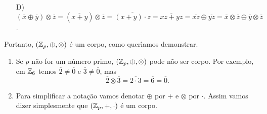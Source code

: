 \begin{prova}
\begin{enumerate}
\begin{align*}
			&\overline{xy} \oplus \overline{pz} = \overline{1}\\
			&\overline{x} \otimes \overline{y} + \overline{p} \otimes \overline{z} = \overline{1}\\
			&\overline{x} \otimes \overline{y} = \overline{1}
		\end{align*}
		uma vez que $\overline{p} = \overline{0}$. Como $\overline{y}$ \'e obtido pelo resto da divis\~ao inteira de $y$ por $p$, ent\~ao 
		$\overline{y} \in \integer_p$. Observe que $y \ne 0$ pois $p \ge 2$ e $y \ne p$ pois sen\~ao $(a + p)y = 1$ o que \'e imposs{\'\i}vel uma vez que $p \ge 2$. Logo $\overline{y} \ne 0$ e assim todo elemento $\overline{x} \in \integer_p$ possui inverso multiplicativo.
		\item[D)] $(\overline{x} \oplus \overline{y}) \otimes \overline{z}= (\overline{x + y}) \otimes \overline{z} = \overline{(x + y) \cdot z} = \overline{xz + yz} = \overline{xz} \oplus \overline{yz} = \overline{x} \otimes \overline{z} \oplus \overline{y} \otimes \overline{z}$.
	\end{enumerate}
	Portanto, $(\mathbb{Z}_p, \oplus, \otimes)$ \'e um corpo, como quer{\'\i}amos demonstrar.
\end{prova}

\begin{observacao}
	\begin{enumerate}
		\item Se $p$ n\~ao for um n\'umero primo, $(\mathbb{Z}_p, \oplus, \otimes)$ pode n\~ao ser corpo. Por exemplo, em $\mathbb{Z}_6$ temos $\overline{2} \ne \overline{0}$ e $\overline{3} \ne \overline{0}$, mas
	\[
	  \overline{2}\otimes \overline{3} = \overline{2\cdot 3} = \overline{6} = \overline{0}.
	\]

	\item Para simplificar a nota\c{c}\~ao vamos denotar $\oplus$ por $+$ e $\otimes$ por $\cdot$. Assim vamos dizer simplesmente que $(\mathbb{Z}_p, +, \cdot)$ \'e um corpo.
	\end{enumerate}
\end{observacao}


